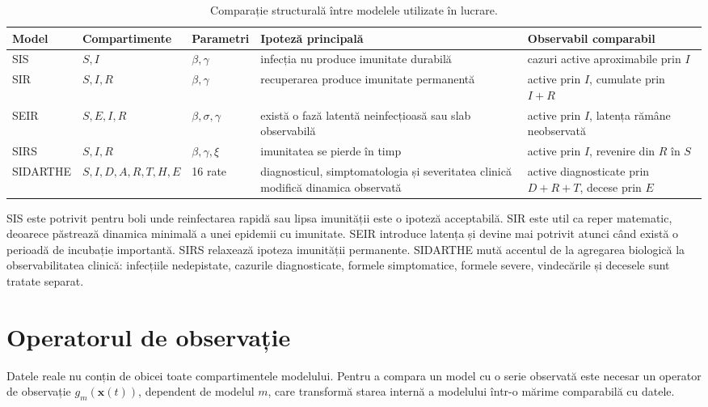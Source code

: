 \begin{table}[t]
\centering
\caption[Comparația structurală a modelelor]{Comparație structurală între modelele utilizate în lucrare.}
\label{tab:comparatie_modele}
\begin{tabularx}{0.96\textwidth}{l l l X X}
\toprule
\textbf{Model} & \textbf{Compartimente} & \textbf{Parametri} & \textbf{Ipoteză principală} & \textbf{Observabil comparabil} \\
\midrule
SIS & $S,I$ & $\beta,\gamma$ & infecția nu produce imunitate durabilă & cazuri active aproximabile prin $I$ \\
SIR & $S,I,R$ & $\beta,\gamma$ & recuperarea produce imunitate permanentă & active prin $I$, cumulate prin $I+R$ \\
SEIR & $S,E,I,R$ & $\beta,\sigma,\gamma$ & există o fază latentă neinfecțioasă sau slab observabilă & active prin $I$, latența rămâne neobservată \\
SIRS & $S,I,R$ & $\beta,\gamma,\xi$ & imunitatea se pierde în timp & active prin $I$, revenire din $R$ în $S$ \\
SIDARTHE & $S,I,D,A,R,T,H,E$ & 16 rate & diagnosticul, simptomatologia și severitatea clinică modifică dinamica observată & active diagnosticate prin $D+R+T$, decese prin $E$ \\
\bottomrule
\end{tabularx}
\end{table}

SIS este potrivit pentru boli unde reinfectarea rapidă sau lipsa imunității este
o ipoteză acceptabilă. SIR este util ca reper matematic, deoarece păstrează
dinamica minimală a unei epidemii cu imunitate. SEIR introduce latența și devine
mai potrivit atunci când există o perioadă de incubație importantă. SIRS relaxează
ipoteza imunității permanente. SIDARTHE mută accentul de la agregarea biologică
la observabilitatea clinică: infecțiile nedepistate, cazurile diagnosticate,
formele simptomatice, formele severe, vindecările și decesele sunt tratate
separat.

\section{Operatorul de observație}
\label{sec:operator_observatie}

Datele reale nu conțin de obicei toate compartimentele modelului. Pentru a compara
un model cu o serie observată este necesar un operator de observație
$g_m(\mathbf{x}(t))$, dependent de modelul $m$, care transformă starea internă a
modelului într-o mărime comparabilă cu datele.

